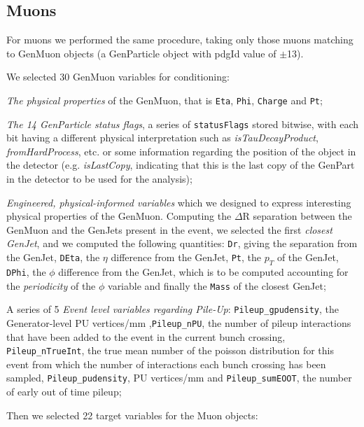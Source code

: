 \subsection{Muons}

For muons we performed the same procedure, taking only those muons matching to GenMuon objects (a GenParticle object with pdgId value of $\pm$13). 

We selected 30 GenMuon variables for conditioning:

\begin{outline}
\1 \emph{The physical properties} of the GenMuon, that is \texttt{Eta}, \texttt{Phi}, \texttt{Charge} and \texttt{Pt};

\1 \emph{The 14 GenParticle status flags}, a series of \texttt{statusFlags} stored bitwise, with each bit having a different physical interpretation such as \emph{isTauDecayProduct}, \emph{fromHardProcess}, etc. or some information regarding the position of the object in the detector (e.g. \emph{isLastCopy}, indicating that this is the last copy of the GenPart in the detector to be used for the analysis);

\1 \emph{Engineered, physical-informed variables} which we designed to express interesting physical properties of the GenMuon. Computing the $\Delta$R separation between the GenMuon and the GenJets present in the event, we selected the first \emph{closest GenJet}, and we computed the following quantities:
\2 \texttt{Dr}, giving the separation from the GenJet, \texttt{DEta}, the $\eta$ difference from the GenJet, \texttt{Pt}, the $p_T$ of the GenJet,
\texttt{DPhi}, the $\phi$ difference from the GenJet, which is to be computed accounting for the \emph{periodicity} of the $\phi$ variable and finally the \texttt{Mass} of the closest GenJet;

\1 A series of 5 \emph{ Event level variables regarding Pile-Up}: \texttt{Pileup\_gpudensity}, the Generator-level PU vertices/mm ,\texttt{Pileup\_nPU}, the number of pileup interactions that have been added to the event in the current bunch crossing, \texttt{Pileup\_nTrueInt}, the true mean number of the poisson distribution for this event from which the number of interactions each bunch crossing has been sampled, \texttt{Pileup\_pudensity}, PU vertices/mm and \texttt{Pileup\_sumEOOT}, the number of early out of time pileup;
\end{outline}

Then we selected 22 target variables for the Muon objects:

